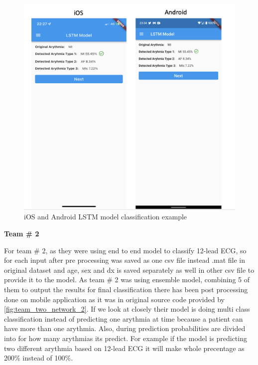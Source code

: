 \begin{figure}[H]
\centering
\includegraphics[scale=0.4]{img/lstm_deployment.png}
\caption{iOS and Android LSTM model classification example}
\label{dnn_deloyment}
\end{figure}

\textbf{Team \# 2}

For team \# 2, as they were using end to end model to classify 12-lead ECG, so for each input after pre processing was saved as one csv file instead .mat file in original dataset and age, sex and dx is saved separately as well in other csv file to provide it to the model. As team \# 2 was using ensemble model, combining 5 of them to output the results for final classification there has been post processing done on mobile application as it was in original source code provided by \ref{fig:team_two_network_2}. If we look at closely their model is doing multi class classification instead of predicting one arythmia at time because a patient can have more than one arythmia. Also, during prediction probabilities are divided into for how many arythmias its predict. For example if the model is predicting two different arythmia based on 12-lead ECG it will make whole precentage as 200\% instead of 100\%. 

